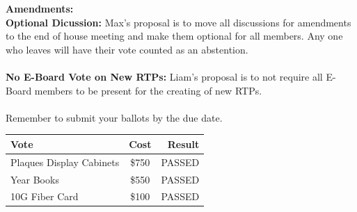 \documentclass[9pt]{extarticle} %
\begin{document}
\begin{minipage}[t]{.45\linewidth}
\begin{mdframed}[style=sidebar,frametitle={}]

\textbf{Amendments:} \\
\textbf{Optional Dicussion:} Max's proposal is to move all discussions for amendments
to the end of house meeting and make them optional for all members. Any one who
leaves will have their vote counted as an abstention.
\\
\\
\textbf{No E-Board Vote on New RTPs:} Liam's proposal is to not require all
E-Board members to be present for the creating of new RTPs.
\\
\\
Remember to submit your ballots by the due date.

\begin{tabular}{lcr}

Vote & Cost & Result \\
\midrule
Plaques Display Cabinets & \$750 & PASSED \\
Year Books & \$550 & PASSED \\
10G Fiber Card & \$100 & PASSED \\
\bottomrule
\end{tabular}


\end{mdframed}
\end{minipage}\hfill %
%
%
\end{document}
